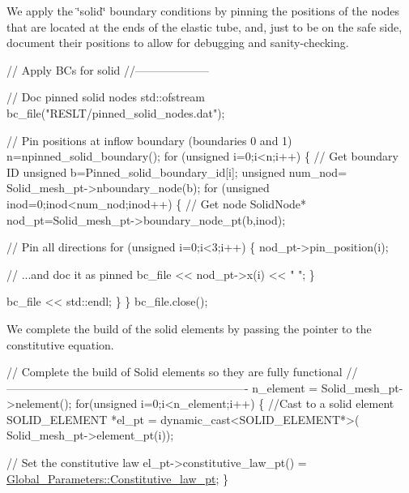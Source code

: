 We apply the \char`\"{}solid\char`\"{} boundary conditions by pinning the positions of the nodes that are located at the ends of the elastic tube, and, just to be on the safe side, document their positions to allow for debugging and sanity-\/checking.


\begin{DoxyCodeInclude}



 \textcolor{comment}{// Apply BCs for solid}
 \textcolor{comment}{//--------------------}
 
 \textcolor{comment}{// Doc pinned solid nodes}
 std::ofstream bc\_file(\textcolor{stringliteral}{"RESLT/pinned\_solid\_nodes.dat"});
 
 \textcolor{comment}{// Pin positions at inflow boundary (boundaries 0 and 1)}
 n=npinned\_solid\_boundary();
 \textcolor{keywordflow}{for} (\textcolor{keywordtype}{unsigned} i=0;i<n;i++)
  \{
   \textcolor{comment}{// Get boundary ID}
   \textcolor{keywordtype}{unsigned} b=Pinned\_solid\_boundary\_id[i];
   \textcolor{keywordtype}{unsigned} num\_nod= Solid\_mesh\_pt->nboundary\_node(b);  
   \textcolor{keywordflow}{for} (\textcolor{keywordtype}{unsigned} inod=0;inod<num\_nod;inod++)
    \{    
     \textcolor{comment}{// Get node}
     SolidNode* nod\_pt=Solid\_mesh\_pt->boundary\_node\_pt(b,inod);
     
     \textcolor{comment}{// Pin all directions}
     \textcolor{keywordflow}{for} (\textcolor{keywordtype}{unsigned} i=0;i<3;i++)
      \{
       nod\_pt->pin\_position(i);
       
       \textcolor{comment}{// ...and doc it as pinned}
       bc\_file << nod\_pt->x(i) << \textcolor{stringliteral}{" "};
      \}
     
     bc\_file << std::endl;
    \}
  \}
 bc\_file.close();

\end{DoxyCodeInclude}


We complete the build of the solid elements by passing the pointer to the constitutive equation.


\begin{DoxyCodeInclude}
 
 
 
 \textcolor{comment}{// Complete the build of Solid elements so they are fully functional}
 \textcolor{comment}{//----------------------------------------------------------------}
 n\_element = Solid\_mesh\_pt->nelement();
 \textcolor{keywordflow}{for}(\textcolor{keywordtype}{unsigned} i=0;i<n\_element;i++)
  \{
   \textcolor{comment}{//Cast to a solid element}
   SOLID\_ELEMENT *el\_pt = \textcolor{keyword}{dynamic\_cast<}SOLID\_ELEMENT*\textcolor{keyword}{>}(
    Solid\_mesh\_pt->element\_pt(i));
   
   \textcolor{comment}{// Set the constitutive law   }
   el\_pt->constitutive\_law\_pt() =
    \hyperlink{namespaceGlobal__Parameters_adbd1f040f375c96fe56b3f475f7dbec2}{Global\_Parameters::Constitutive\_law\_pt};
  \}

\end{DoxyCodeInclude}


